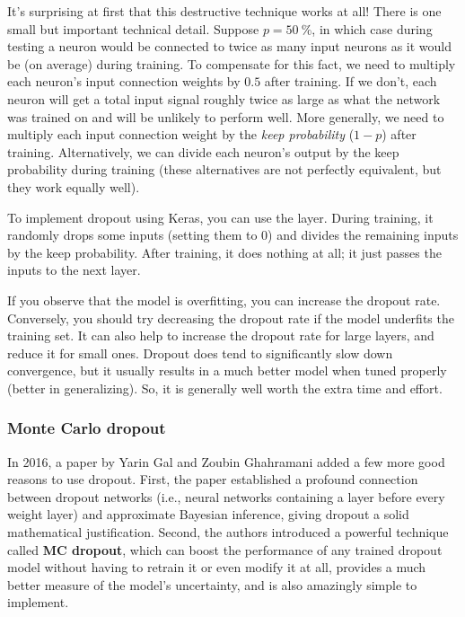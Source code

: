 It's surprising at first that this destructive technique works at all! There is one small but important technical detail. Suppose $p=\SI{50}{\percent}$, in which case during testing a neuron would be connected to twice as many
input neurons as it would be (on average) during training. To compensate for this fact, we need to multiply each neuron's input connection weights by $0.5$ after training. If we don't, each neuron will get a total input signal roughly twice as large as what the network was trained on and will be unlikely to perform well. More generally, we need to multiply each input connection weight by the \emph{keep probability} ($1-p$) after training. Alternatively, we can divide each neuron's output by the keep probability during training (these alternatives are not perfectly equivalent, but they work equally well).

To implement dropout using Keras, you can use the  layer. During training, it randomly drops some inputs (setting them to 0) and divides the remaining inputs by the keep probability. After training, it does nothing at all; it just passes the inputs to the next layer.

If you observe that the model is overfitting, you can increase the dropout rate. Conversely, you should try decreasing the dropout rate if the model underfits the training set. It can also help to increase the dropout rate for
large layers, and reduce it for small ones.
Dropout does tend to significantly slow down convergence, but it usually results in a much better model when tuned properly (better in generalizing). So, it is generally well worth the extra time and effort.
\subsubsection{Monte Carlo dropout}
In 2016, a paper by Yarin Gal and Zoubin Ghahramani added a few more good reasons to use dropout. First, the paper established a profound connection between dropout networks (i.e., neural networks containing a  layer before every weight layer) and approximate Bayesian inference, giving dropout a solid mathematical justification. Second, the authors introduced a powerful technique called \textbf{MC dropout}, which can boost the performance of any trained dropout model without having to retrain it or even modify it at all, provides a much better measure of the model's uncertainty, and is also amazingly simple to implement.


